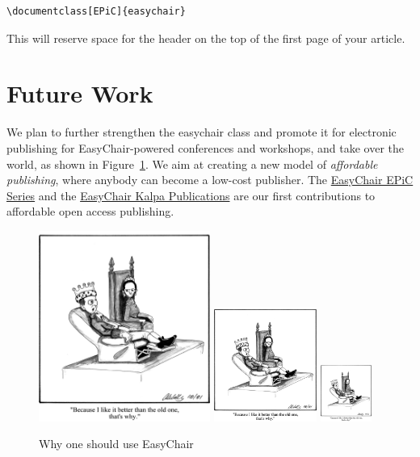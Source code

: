 \documentclass[EPiC]{easychair}
\newcommand{\easychair}{\textsf{easychair}}
\begin{document}
\small
\begin{verbatim}
\documentclass[EPiC]{easychair}
\end{verbatim}
\normalsize
This will reserve space for the header on the top of the first page of your
article. 

\section{Future Work}
\label{sect:future-work}

We plan to further strengthen the {\easychair} class and promote it for 
electronic publishing for EasyChair-powered conferences and workshops,
and take over the world, as shown in Figure~\ref{fig:easythrone}. We
aim at creating a new model of \emph{affordable publishing}, where
anybody can become a low-cost publisher. The
\href{http://www.easychair.org/publications/EPiC}{EasyChair EPiC
  Series} and
the
\href{http://www.easychair.org/publications/Kalpa}{EasyChair Kalpa Publications} 
are our first contributions to affordable open access publishing.

\begin{figure}[tb]
  \begin{centering}
    \includegraphics[width=0.5\textwidth]{throneEC.jpg}
    \includegraphics[width=0.3\textwidth]{throneEC.jpg}
    \includegraphics[width=0.15\textwidth]{throneEC.jpg}
  \end{centering}
  \caption{Why one should use EasyChair}
  \label{fig:easythrone}
\end{figure}
\end{document}
